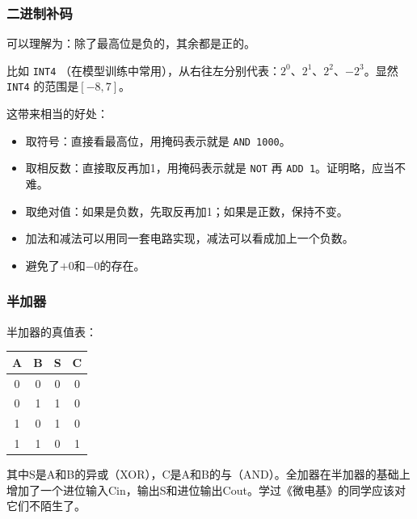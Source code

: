 \documentclass[fontset=none,aspectratio=1610]{ctexbeamer}
\begin{document}
\begin{frame}
    \frametitle{二进制补码}

    可以理解为：除了最高位是负的，其余都是正的。

    比如 \texttt{INT4} （在模型训练中常用），从右往左分别代表：$2^0$、$2^1$、$2^2$、$-2^3$。显然 \texttt{INT4} 的范围是$[-8, 7]$。
    
    这带来相当的好处：
    \begin{itemize}
        \item 取符号：直接看最高位，用掩码表示就是 \texttt{AND 1000}。
        \item 取相反数：直接取反再加1，用掩码表示就是 \texttt{NOT} 再 \texttt{ADD 1}。证明略，应当不难。
        \item 取绝对值：如果是负数，先取反再加1；如果是正数，保持不变。
        \item 加法和减法可以用同一套电路实现，减法可以看成加上一个负数。
        \item 避免了$+0$和$-0$的存在。
    \end{itemize}

\end{frame}

\begin{frame}
    \frametitle{半加器}

    半加器的真值表：
    \begin{table}[h]
        \centering
        \begin{tabular}{cc|cc}
            \hline
            A & B & S & C \\
            \hline
            0 & 0 & 0 & 0 \\
            0 & 1 & 1 & 0 \\
            1 & 0 & 1 & 0 \\
            1 & 1 & 0 & 1 \\
            \hline
        \end{tabular}
    \end{table}
    其中S是A和B的异或（XOR），C是A和B的与（AND）。全加器在半加器的基础上增加了一个进位输入Cin，输出S和进位输出Cout。学过《微电基》的同学应该对它们不陌生了。
\end{frame}
\end{document}
